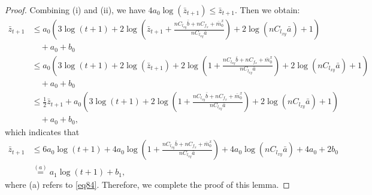 \documentclass{article}
\theoremstyle{plain}
\theoremstyle{definition}
\theoremstyle{remark}
\begin{document}
\begin{proof}
Combining (i) and (ii), we have $4a_0 \log(\bar{z}_{t+1}) \leq \bar{z}_{t+1}$. Then we obtain:
\begin{align}
  \bar{z}_{t+1} & \leq a_0 \left(3 \log(t + 1) + 2 \log \left(  \bar{z}_{t+1} + \frac{nC_{l_{xy}} \bar{b} + nC_{f_x} + \bar{m}^x_0}{nC_{l_{xy}} \bar{a}} \right)+2 \log \left(n C_{l_{xy}} \bar{a}\right) + 1\right)\nonumber\\
  &\quad+ a_0 + b_0\nonumber\\ 
  &\leq  a_0 \left(3 \log(t + 1) \!+\! 2 \log \left(  \bar{z}_{t+1}\right)\!+\!2 \log \left(\! 1\! +\! \frac{nC_{l_{xy}} \bar{b} \!+\! nC_{f_x} \!+\! \bar{m}^x_0}{nC_{l_{xy}} \bar{a}} \right)\!+\!2 \log \left( nC_{l_{xy}} \bar{a}\right) \!+\! 1\right)\nonumber\\
  &\quad + a_0 + b_0\nonumber\\
  &\leq \frac{1}{2} \bar{z}_{t+1} + a_0 \left(3 \log(t + 1) +2 \log \left( 1 + \frac{nC_{l_{xy}} \bar{b} + nC_{f_x} + \bar{m}^x_0}{nC_{l_{xy}} \bar{a}} \right)+2 \log \left( nC_{l_{xy}} \bar{a}\right) + 1\right)\nonumber\\
  &\quad + a_0 + b_0,\label{eq103}
\end{align}
which indicates that
\begin{align}
    \bar{z}_{t+1}&\leq 6a_0 \log(t + 1) + 4a_0 \log \left( 1 + \frac{nC_{l_{xy}} \bar{b} + nC_{f_x} + \bar{m}^x_0}{nC_{l_{xy}} \bar{a}} \right) + 4a_0\log \left( nC_{l_{xy}} \bar{a}\right) + 4a_0 + 2b_0\nonumber\\
    &\overset{(a)}{=}a_1 \log(t + 1) + b_1,\label{eq104}
\end{align}
where (a) refers to \cref{eq84}. Therefore, we complete the proof of this lemma.
\end{proof}
\end{document}
